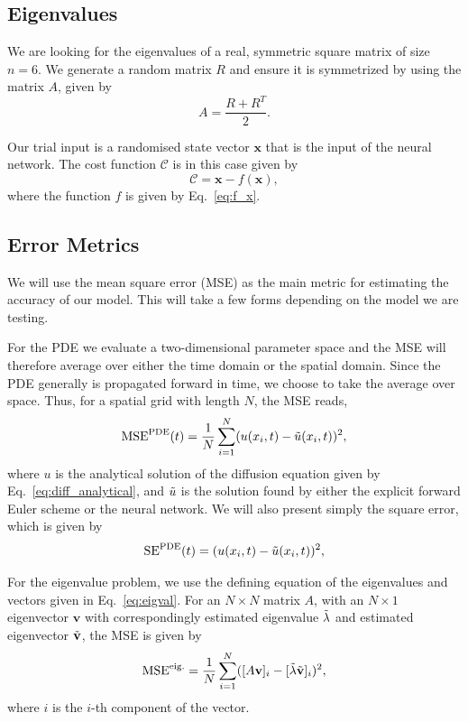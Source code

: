 \documentclass[a4paper, 
amsfonts, 
amssymb, 
amsmath, 
reprint, 
showkeys, 
nofootinbib, 
twoside]{revtex4-2}
\begin{document}
\subsection{Eigenvalues}

We are looking for the eigenvalues of a real, symmetric square matrix of size $n = 6$. We generate a random matrix $R$ and ensure it is symmetrized by using the matrix $A$, given by
\begin{equation}
    A = \frac{R + R^T}{2}.
\end{equation}

Our trial input is a randomised state vector $\mathbf{x}$ that is the input of the neural network. The cost function $\mathcal{C}$ is in this case given by
\begin{equation}
    \mathcal{C} = \mathbf{x} - f(\mathbf{x}),
\end{equation}
where the function $f$ is given by Eq.~\eqref{eq:f_x}.

\subsection{Error Metrics}

We will use the mean square error (MSE) as the main metric for estimating the accuracy of our model. This will take a few forms depending on the model we are testing. 

For the PDE we evaluate a two-dimensional parameter space and the MSE will therefore average over either the time domain or the spatial domain. Since the PDE generally is propagated forward in time, we choose to take the average over space. Thus, for a spatial grid with length $N$, the MSE reads,
\begin{equation}
    \textrm{MSE}^{\textrm{PDE}}(t) = \frac{1}{N} \sum_{i = 1} ^N (u(x_i, t) - \Tilde{u}(x_i, t) )^2,
\end{equation}
where $u$ is the analytical solution of the diffusion equation given by Eq.~\eqref{eq:diff_analytical}, and $\Tilde{u}$ is the solution found by either the explicit forward Euler scheme or the neural network.
We will also present simply the square error, which is given by
\begin{equation}
    \textrm{SE}^{\textrm{PDE}}(t) =  (u(x_i, t) - \Tilde{u}(x_i, t) )^2,
\end{equation}

For the eigenvalue problem, we use the defining equation of the eigenvalues and vectors given in Eq.~\eqref{eq:eigval}. 
For an $N \times N$ matrix $A$, with an $N \times 1$ eigenvector $\mathbf{v}$ with correspondingly estimated eigenvalue $\Tilde{\lambda}$ and estimated eigenvector $\Tilde{\mathbf{v}}$, the MSE is given by
\begin{equation}
    \textrm{MSE}^{\textrm{eig.}} = \frac{1}{N}\sum_{i = 1}^N ([A \mathbf{v}]_i - [\Tilde{\lambda}\Tilde{\mathbf{v}}]_i)^2,
    \label{eq:mse_eig}
\end{equation}
where $i$ is the $i$-th component of the vector.
\end{document}
